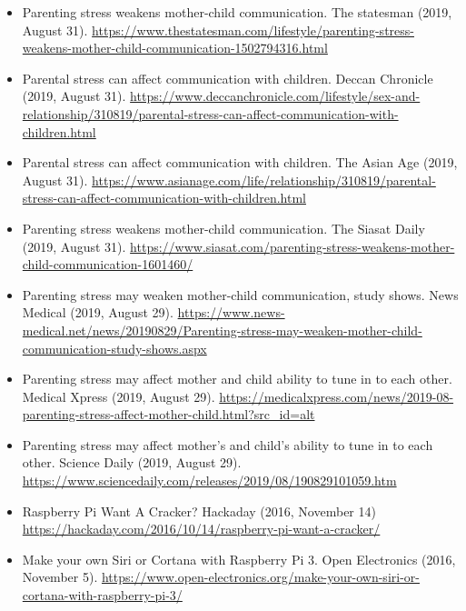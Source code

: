 \documentclass[10pt,a4paper]{altacv}
\begin{document}
\begin{fullwidth}
\begin{itemize}
			\item Parenting stress weakens mother-child communication. The statesman (2019, August 31). \url{https://www.thestatesman.com/lifestyle/parenting-stress-weakens-mother-child-communication-1502794316.html}
			\item Parental stress can affect communication with children. Deccan Chronicle (2019, August 31). \url{https://www.deccanchronicle.com/lifestyle/sex-and-relationship/310819/parental-stress-can-affect-communication-with-children.html}
			\item Parental stress can affect communication with children. The Asian Age (2019, August 31). \url{https://www.asianage.com/life/relationship/310819/parental-stress-can-affect-communication-with-children.html}
			\item Parenting stress weakens mother-child communication. The Siasat Daily (2019, August 31). \url{https://www.siasat.com/parenting-stress-weakens-mother-child-communication-1601460/}
			\item Parenting stress may weaken mother-child communication, study shows. News Medical (2019, August 29). \url{https://www.news-medical.net/news/20190829/Parenting-stress-may-weaken-mother-child-communication-study-shows.aspx}
			\item Parenting stress may affect mother and child ability to tune in to each other. Medical Xpress (2019, August 29). \url{https://medicalxpress.com/news/2019-08-parenting-stress-affect-mother-child.html?src_id=alt}
			\item Parenting stress may affect mother's and child's ability to tune in to each other. Science Daily (2019, August 29). \url{https://www.sciencedaily.com/releases/2019/08/190829101059.htm}	
			\item Raspberry Pi Want A Cracker? Hackaday (2016, November 14) \url{https://hackaday.com/2016/10/14/raspberry-pi-want-a-cracker/}
			\item Make your own Siri or Cortana with Raspberry Pi 3. Open Electronics (2016, November 5). \url{https://www.open-electronics.org/make-your-own-siri-or-cortana-with-raspberry-pi-3/}
			
		\end{itemize}
		


\end{fullwidth}
\end{document}
